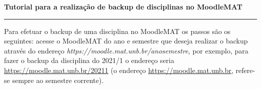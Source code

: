 \documentclass[12pt]{report}
\begin{document}
\begin{center}
{\Large \textbf{Tutorial para a realiza\c{c}\~ao de backup de disciplinas no MoodleMAT}}
\end{center}
\vspace{.3cm}
\hrule

\vspace{.7cm}

Para efetuar o backup de uma disciplina no MoodleMAT os passos s\~ao os seguintes: acesse o MoodleMAT do ano e semestre que deseja realizar o backup atrav\'es do endere\c{c}o \textit{https://moodle.mat.unb.br/anosemestre}, por exemplo, para fazer o backup da disciplina do 2021/1 o endere\c{c}o seria \href{https://moodle.mat.unb.br/20211}{https://moodle.mat.unb.br/20211} (o endere\c{c}o \href{https://moodle.mat.unb.br}{https://moodle.mat.unb.br}, refere-se sempre ao semestre corrente).
\end{document}

